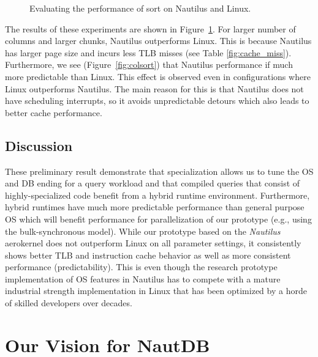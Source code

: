 \documentclass[conference]{IEEEtran}
\begin{document}
\begin{figure}[t]
\begin{minipage}{0.31\linewidth}
    \label{fig:cache_miss}
  \end{minipage}

\caption{Evaluating the performance of sort on Nautilus and Linux.}
  \label{fig:perf-eval}
\end{figure}

The results of these experiments are shown in Figure~\ref{fig:perf-eval}. For larger number of columns and larger chunks, Nautilus outperforms Linux. This is because Nautilus has larger page size and incurs less TLB misses (see Table \ref{fig:cache_miss}). Furthermore, we see (Figure~\ref{fig:colsort}) that Nautilus performance if much more predictable than Linux. This effect is observed even in configurations where Linux outperforms Nautilus. The main reason for this is that Nautilus does not have scheduling interrupts, so it avoids unpredictable detours which also leads to better cache performance.



\subsection{Discussion}
\label{sec:discussion}


These preliminary result demonstrate that specialization allows us to tune the OS and DB ending for a query workload and that compiled queries that consist of highly-specialized code benefit from a hybrid runtime environment.
Furthermore, hybrid runtimes have much more predictable performance than general purpose OS which will benefit performance for parallelization of our prototype (e.g., using the bulk-synchronous model).
While our prototype based on the \emph{Nautilus} aerokernel does not outperform Linux on all parameter settings, it consistently shows better TLB and instruction cache behavior as well as more consistent performance (predictability). This is even though the  research prototype implementation of OS features in Nautilus has to compete with a mature industrial strength implementation in Linux that has been optimized by a horde of skilled developers over decades. 

\section{Our Vision for NautDB}
\label{sec:our-vision-nautdb}
\end{document}
